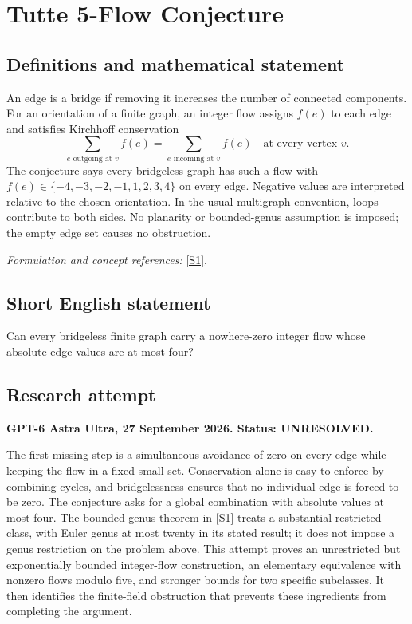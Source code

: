 \documentclass[11pt]{article}
\begin{document}
\section*{\texorpdfstring{Tutte 5-Flow Conjecture}{Tutte 5-Flow Conjecture}}\label{299}
\subsection{Definitions and mathematical statement}
An edge is a bridge if removing it increases the number of connected components. For an orientation of a finite graph, an integer flow assigns $f(e)$ to each edge and satisfies Kirchhoff conservation
\[
 \sum_{e\text{ outgoing at }v}f(e)=\sum_{e\text{ incoming at }v}f(e)
 \quad\text{at every vertex }v.
\]
The conjecture says every bridgeless graph has such a flow with
$f(e)\in\{-4,-3,-2,-1,1,2,3,4\}$ on every edge. Negative values are interpreted relative to the chosen orientation. In the usual multigraph convention, loops contribute to both sides. No planarity or bounded-genus assumption is imposed; the empty edge set causes no obstruction.
\par\smallskip\textit{Formulation and concept references:} \href{https://www.ort.shu.edu.cn/EN/abstract/abstract21516.shtml}{[S1]}.

\subsection{Short English statement}
Can every bridgeless finite graph carry a nowhere-zero integer flow whose absolute edge values are at most four?
\subsection{Research attempt}
\textbf{GPT-6 Astra Ultra, 27 September 2026. Status: UNRESOLVED.}

The first missing step is a simultaneous avoidance of zero on every edge while keeping the flow in a fixed small set. Conservation alone is easy to enforce by combining cycles, and bridgelessness ensures that no individual edge is forced to be zero. The conjecture asks for a global combination with absolute values at most four. The bounded-genus theorem in [S1] treats a substantial restricted class, with Euler genus at most twenty in its stated result; it does not impose a genus restriction on the problem above. This attempt proves an unrestricted but exponentially bounded integer-flow construction, an elementary equivalence with nonzero flows modulo five, and stronger bounds for two specific subclasses. It then identifies the finite-field obstruction that prevents these ingredients from completing the argument.
\end{document}
